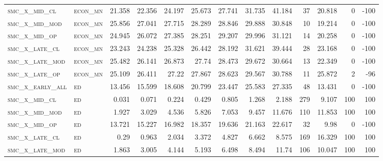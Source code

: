 \begin{landscape}
\begin{center}
\begin{footnotesize}
\begin{longtable}{llrrrrrrrr|rrr}
\textsc{smc\_x\_mid\_cl   } & \textsc{econ\_mn  }   & 21.358   & 22.356   & 24.197   & 25.673   & 27.741   & 31.735   & 41.184   & 37     & 20.818        & 0             & -100            \\
\textsc{smc\_x\_mid\_mod  } & \textsc{econ\_mn  }   & 25.856   & 27.041   & 27.715   & 28.289   & 28.846   & 29.888   & 30.848   & 10     & 19.214        & 0             & -100            \\
\textsc{smc\_x\_mid\_op   } & \textsc{econ\_mn  }   & 24.945   & 26.072   & 27.385   & 28.251   & 29.207   & 29.996   & 31.121   & 14     & 20.258        & 0             & -100            \\
\textsc{smc\_x\_late\_cl  } & \textsc{econ\_mn  }   & 23.243   & 24.238   & 25.328   & 26.442   & 28.192   & 31.621   & 39.444   & 28     & 23.168        & 0             & -100            \\
\textsc{smc\_x\_late\_mod } & \textsc{econ\_mn  }   & 25.482   & 26.141   & 26.873   & 27.74    & 28.473   & 29.672   & 30.664   & 13     & 22.349        & 0             & -100            \\
\textsc{smc\_x\_late\_op  } & \textsc{econ\_mn  }   & 25.109   & 26.411   & 27.22    & 27.867   & 28.623   & 29.567   & 30.788   & 11     & 25.872        & 2             & -96             \\
\textsc{smc\_x\_early\_all} & \textsc{ed        }   & 13.456   & 15.599   & 18.608   & 20.799   & 23.447   & 25.583   & 27.335   & 48     & 13.431        & 0             & -100            \\
\textsc{smc\_x\_mid\_cl   } & \textsc{ed        }   & 0.031    & 0.071    & 0.224    & 0.429    & 0.805    & 1.268    & 2.188    & 279    & 9.107         & 100           & 100             \\
\textsc{smc\_x\_mid\_mod  } & \textsc{ed        }   & 1.927    & 3.029    & 4.536    & 5.826    & 7.053    & 9.457    & 11.676   & 110    & 11.853        & 100           & 100             \\
\textsc{smc\_x\_mid\_op   } & \textsc{ed        }   & 13.721   & 15.227   & 16.982   & 18.357   & 19.636   & 21.163   & 22.617   & 32     & 9.98          & 0             & -100            \\
\textsc{smc\_x\_late\_cl  } & \textsc{ed        }   & 0.29     & 0.963    & 2.034    & 3.372    & 4.827    & 6.662    & 8.575    & 169    & 16.329        & 100           & 100             \\
\textsc{smc\_x\_late\_mod } & \textsc{ed        }   & 1.863    & 3.005    & 4.144    & 5.193    & 6.498    & 8.494    & 11.74    & 106    & 10.047        & 100           & 100             \\

\end{longtable}
\end{footnotesize}
\end{center}
\end{landscape}
